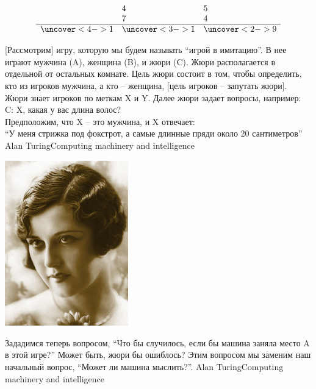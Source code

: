 \documentclass[24pt,pdf,hyperref={unicode},aspectratio=169]{beamer}
\begin{document}
\begin{frame}\frametitle{}
{\huge
$$
\begin{array}{l l l}
& 4 & 5 \\
& 7 & 4 \\
\hline
\uncover<4->{1} & \uncover<3->{1} & \uncover<2->{9} \\
\end{array}
$$
}
\end{frame}

\begin{frame}
\citate
{
[Рассмотрим] игру, которую мы будем называть ``игрой в имитацию''. В нее играют мужчина (A), женщина (B), и жюри (C). Жюри располагается в отдельной от остальных комнате. Цель жюри состоит в том, чтобы определить, кто из игроков мужчина, а кто -- женщина, [цель игроков -- запутать жюри]. Жюри знает игроков по меткам X и Y. Далее жюри задает вопросы, например:\\[0.2cm]

C: X, какая у вас длина волос? \\[0.2cm]

Предположим, что X -- это мужчина, и X отвечает:\\[0.2cm]

``У меня стрижка под фокстрот, а самые длинные пряди около 20 сантиметров''
}{Alan Turing}{Computing machinery and intelligence}
\end{frame}

\begin{frame}
\begin{center}
\includegraphics[width=0.4\textwidth]{Portraits/Shingled.jpg}
\end{center}
\end{frame}


\begin{frame}

\citate
{
Зададимся теперь вопросом, ``Что бы случилось, если бы машина заняла место A в этой игре?'' Может быть, жюри бы ошиблось? Этим вопросом мы заменим наш начальный вопрос, ``Может ли машина мыслить?''.
}{Alan Turing}{Computing machinery and intelligence}

\end{frame}
\end{document}
